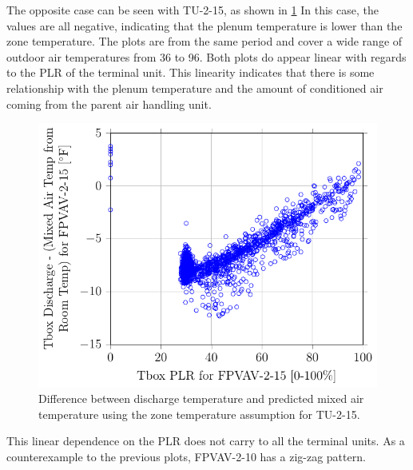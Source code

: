 The opposite case can be seen with TU-2-15, as shown in \figref{}
\ref{fig:2017-01-09-1434-TboxDischargeMixedAirTempfromRoomTempforFPVAV215vsTboxPLRforFPVAV215}
In this case, the values are all negative, indicating that the plenum
temperature is lower than the zone temperature. The plots are from the
same period and cover a wide range of outdoor air temperatures from
\SI{36}{\degreeF} to \SI{96}{\degreeF}. Both plots do appear linear with
regards to the PLR of the terminal unit. This linearity indicates that there is
some relationship with the plenum temperature and the amount of
conditioned air coming from the parent air handling unit.

\begin{figure}
\centering
\includegraphics[]{Plots/2017-01-09-1434-TboxDischargeMixedAirTempfromRoomTempforFPVAV215vsTboxPLRforFPVAV215.pdf}
\caption{Difference between discharge temperature and predicted mixed
air temperature using the zone temperature assumption for TU-2-15.}
\label{fig:2017-01-09-1434-TboxDischargeMixedAirTempfromRoomTempforFPVAV215vsTboxPLRforFPVAV215}
\end{figure}


This linear dependence on the PLR does not carry to all the terminal
units. As a counterexample to the previous plots, FPVAV-2-10 has a
zig-zag pattern. 


